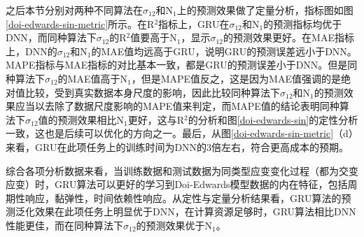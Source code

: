 之后本节分别对两种不同算法在$\sigma_{12}$和N$_1$上的预测效果做了定量分析，指标图如图\ref{doi-edwards-sin-metric}所示。在R$^2$指标上，GRU在$\sigma_{12}$和N$_1$的预测指标均优于DNN，而同种算法下$\sigma_{12}$的R$^2$值要高于N$_1$，显示$\sigma_{12}$的预测效果更好。在MAE指标上，DNN的$\sigma_{12}$和N$_1$的MAE值均远高于GRU，说明GRU的预测误差远小于DNN。MAPE指标与MAE指标的对比基本一致，都是GRU的预测误差小于DNN。但是同种算法下$\sigma_{12}$的MAE值高于N$_1$，但是MAPE值反之，这是因为MAE值强调的是绝对值比较，受到真实数据本身尺度的影响，因此比较同种算法下$\sigma_{12}$和N$_1$的预测效果应当以去除了数据尺度影响的MAPE值来判定，而MAPE值的结论表明同种算法下$\sigma_{12}$值的预测效果相比N$_1$更好，这与R$^2$的分析和图\ref{doi-edwards-sin}的定性分析一致，这也是后续可以优化的方向之一。最后，从图\ref{doi-edwards-sin-metric}（d）来看，GRU在此项任务上的训练时间为DNN的3倍左右，符合更高成本的预期。

综合各项分析数据来看，当训练数据和测试数据为同类型应变变化过程（都为交变应变）时，GRU算法可以更好的学习到Doi-Edwards模型数据的内在特征，包括周期性响应，黏弹性，时间依赖性响应。从定性与定量分析结果看，GRU算法的预测泛化效果在此项任务上明显优于DNN，在计算资源足够时，GRU算法相比DNN性能更佳，而在同种算法下$\sigma_{12}$的预测效果优于N$_1$。
